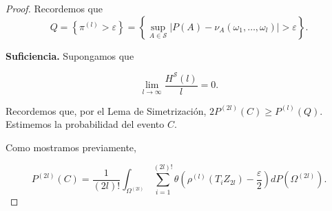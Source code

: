\documentclass{report}
\begin{document}
\begin{proof}

    Recordemos que
\[
Q = \left\{ \pi^{(l)} > \varepsilon \right\} = \left\{ \sup_{A\in\mathcal{S}} |P(A)-\nu_A\left(\omega_1,\ldots, \omega_l\right)| > \varepsilon\right\}.
\]

\textbf{Suficiencia.}
Supongamos que

\[
\lim_{l \to \infty} \frac{H^{\mathcal{S}}(l)}{l} = 0.
\]

Recordemos que, por el Lema de Simetrización, \( 2P^{(2l)}(C) \geq P^{(l)}(Q) \). Estimemos la probabilidad del evento \( C \).

Como mostramos previamente,

\[
P^{(2l)}(C) = \frac{1}{(2l)!} \int_{\Omega^{(2l)}} \sum_{i=1}^{(2l)!} \theta \left( \rho^{(l)}(T_i Z_{2l}) - \frac{\varepsilon}{2} \right) dP(\Omega^{(2l)}).
\]


\end{proof}
\end{document}
